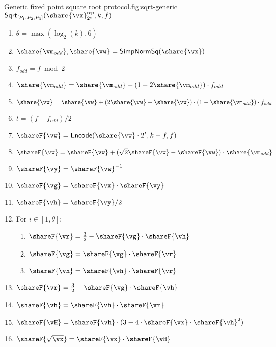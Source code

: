 \begin{Boxfig}{Generic fixed point square root protocol.}{fig:sqrt-generic}
  {$\mathsf{Sqrt}_{[P_1, P_2, P_3]}(\share{\vx}^\mathsf{rep}_{2^k}, k, f)$}
  \begin{enumerate}
    \item $\theta = \max(\log_2(k), 6)$
    \item $\share{\vm_{odd}}, \share{\vw} = \mathsf{SimpNormSq}(\share{\vx})$
    \item $f_{odd} = f \bmod 2$
    \item $\share{\vm_{odd}} = \share{\vm_{odd}} + (1 - 2 \share{\vm_{odd}}) \cdot f_{odd}$
    \item $\share{\vw} = \share{\vw} + (2 \share{\vw} - \share{\vw}) \cdot (1 - \share{\vm_{odd}}) \cdot f_{odd}$
    \item $t = (f - f_{odd}) / 2$
    \item $\shareF{\vw} = \mathsf{Encode}(\share{\vw} \cdot 2^t, k-f, f)$
    \item $\shareF{\vw} = \shareF{\vw} + (\sqrt{2} \shareF{\vw} - \shareF{\vw}) \cdot \share{\vm_{odd}}$
    \item $\shareF{\vy} = \shareF{\vw}^{-1}$
    \item $\shareF{\vg} = \shareF{\vx} \cdot \shareF{\vy}$
    \item $\shareF{\vh} = \shareF{\vy} / 2$
    \item For $i \in [1, \theta]$:
    \begin{enumerate}
      \item $\shareF{\vr} = \frac{3}{2} - \shareF{\vg} \cdot \shareF{\vh}$
      \item $\shareF{\vg} = \shareF{\vg} \cdot \shareF{\vr}$
      \item $\shareF{\vh} = \shareF{\vh} \cdot \shareF{\vr}$
    \end{enumerate}
    \item $\shareF{\vr} = \frac{3}{2} - \shareF{\vg} \cdot \shareF{\vh}$
    \item $\shareF{\vh} = \shareF{\vh} \cdot \shareF{\vr}$
    \item $\shareF{\vH} = \shareF{\vh} \cdot (3 - 4 \cdot \shareF{\vx} \cdot \shareF{\vh}^2)$
    \item $\shareF{\sqrt{\vx}} = \shareF{\vx} \cdot \shareF{\vH}$
  \end{enumerate}
\end{Boxfig}